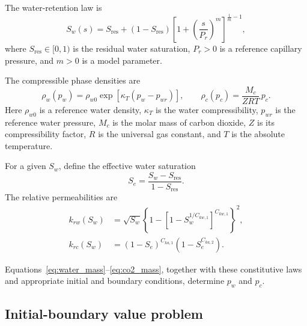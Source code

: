 \documentclass{article}
\begin{document}
The water-retention law is
\[
    S_w(s)
    =
    S_{\mathrm{res}}
    +(1-S_{\mathrm{res}})
    \left[
        1+\left(\frac{s}{P_r}\right)^m
    \right]^{\frac{1}{m}-1},
\]
where $S_{\mathrm{res}}\in[0,1)$ is the residual water saturation,
$P_r>0$ is a reference capillary pressure, and $m>0$ is a model
parameter.

The compressible phase densities are
\[
    \rho_w(p_w)
    =
    \rho_{w0}
    \exp\left[\kappa_T(p_w-p_{wr})\right],
    \qquad
    \rho_c(p_c)
    =
    \frac{M_c}{ZRT}\,p_c.
\]
Here $\rho_{w0}$ is a reference water density, $\kappa_T$ is the water
compressibility, $p_{wr}$ is the reference water pressure, $M_c$ is
the molar mass of carbon dioxide, $Z$ is its compressibility factor,
$R$ is the universal gas constant, and $T$ is the absolute
temperature.

For a given $S_w$, define the effective water saturation
\[
    S_e=\frac{S_w-S_{\mathrm{res}}}{1-S_{\mathrm{res}}}.
\]
The relative permeabilities are
\begin{align*}
    k_{rw}(S_w)
    &=
    \sqrt{S_w}
    \left\{
        1-
        \left[
            1-S_w^{1/C_{kw,1}}
        \right]^{C_{kw,1}}
    \right\}^{2},
    \\
    k_{rc}(S_w)
    &=
    (1-S_e)^{C_{ka,1}}
    \left(1-S_e^{C_{ka,2}}\right).
\end{align*}

Equations~\eqref{eq:water_mass}--\eqref{eq:co2_mass}, together with
these constitutive laws and appropriate initial and boundary
conditions, determine $p_w$ and $p_c$.


\subsection*{Initial-boundary value problem}
\end{document}
